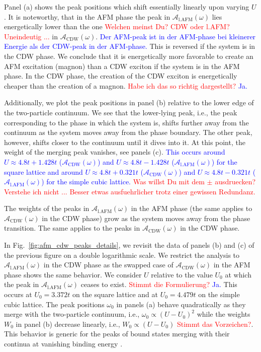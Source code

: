 \documentclass[
    reprint, 
    aps,
    preprintnumbers,
    twocolumn,
    prb,
    superscriptaddress
]{revtex4-2}
\newcommand{\spectral}[1]{\mathcal{A}_\text{#1}  (\omega)}
\newcommand{\red}[1]{\textcolor{red}{#1}}
\newcommand{\blue}[1]{\textcolor{blue}{#1}}
\begin{document}
Panel (a) shows the peak positions which shift essentially linearly upon varying $U$.
It is noteworthy, that in the AFM phase the peak in $\spectral{l.AFM}$ lies energetically
lower than the one \red{Welchen meinst Du? CDW oder l.AFM? Uneindeutig ...} in $\spectral{CDW}$. \blue{Der AFM-peak ist in der AFM-phase bei kleinerer Energie als der CDW-peak in der AFM-phase.}
This is reversed if the system is in the CDW phase.
We conclude that it is energetically more favorable to create an AFM excitation (magnon) than a CDW
exciton if the system is in the AFM phase. In the CDW phase, the creation of the CDW exciton is
energetically cheaper than the creation of a magnon. \red{Habe ich das so richtig dargestellt?} \blue{Ja.}

Additionally, we plot the peak positions in panel (b) relative to the lower edge of the two-particle continuum.
We see that the lower-lying peak, i.e., the peak corresponding to the phase in which the system is, 
shifts further away from the continuum as the system moves away from the phase boundary.
The other peak, however, shifts closer to the continuum until it dives into it.
At this point, the weight of the merging peak vanishes, see panels (c).
\blue{This occurs around $U \approx 4.8t + 1.428t$ ($\spectral{CDW}$) and $U \approx 4.8t - 1.428t$ ($\spectral{l.AFM}$) for the square lattice 
and around $U \approx 4.8t + 0.321t$  ($\spectral{CDW}$) and $U \approx 4.8t - 0.321t$  ($\spectral{l.AFM}$) for the simple cubic lattice.}
\red{Was willst Du mit dem $\pm$ ausdruecken? Verstehe ich nicht ... Besser etwas ausfuehrlicher trotz
einer gewissen Redundanz.}

The weights of the peaks in $\spectral{l.AFM}$ in the AFM phase (the same applies to $\spectral{CDW}$ in the CDW phase) grow as the system moves away from the phase transition.
The same applies to the peaks in $\spectral{CDW}$ in the CDW phase.

In Fig.\ \ref{fig:afm_cdw_peaks_details}, we revisit the data of panels (b) and (c) of the previous figure
on a double logarithmic scale.
We restrict the analysis to $\spectral{l.AFM}$ in the CDW phase as the swapped case of $\spectral{CDW}$ in the 
AFM phase shows the same behavior.
We consider $U$ relative to the value $U_0$ at which the peak in $\spectral{l.AFM}$ ceases to exist.
\red{Stimmt die Formulierung?} \blue{Ja.}
This occurs at $U_0 = 3.372t$ on the square lattice and at $U_0 = 4.479t$ on the simple cubic lattice.
The peak positions $\omega_0$ in panels (a) behave quadratically as they merge with the 
two-particle continuum, i.e., 
$\omega_0 \propto (U-U_0)^2$ while the weights $W_0$ in panel (b) decrease linearly, i.e., 
$W_0 \propto (U-U_0)$ \red{Stimmt das Vorzeichen?}. This behavior is generic for the peaks of bound states merging with
their continua at vanishing binding energy \cite{uhrig96b,uhrig96be,zhito13}.
\end{document}
